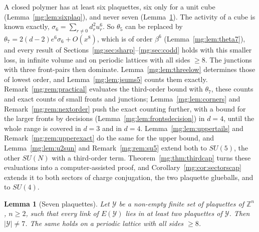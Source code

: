 \documentclass[11pt,a4paper]{article}
\newtheorem{lemma}[theorem]{Lemma}
\theoremstyle{definition}
\theoremstyle{remark}
\newcommand{\Z}{\mathbb{Z}}
\begin{document}
A closed polymer has at least six plaquettes, six only for a unit cube (Lemma~\ref{mg:lem:sixplaq}), and never seven (Lemma~\ref{mg:lem:seven}). The activity of a cube is known
exactly, $\sigma_6=\sum_{r\ne0}d_r^2u_r^6$. So $\theta_5$ can be replaced by $\theta_7=2(d-2)e^6\sigma_6+O(x^8)$, which is of order $\beta^6$ (Lemma~\ref{mg:lem:theta7}), and
every result of Sections~\ref{mg:sec:sharp}--\ref{mg:sec:codd} holds with this smaller loss, in infinite volume and on periodic lattices with all sides $\ge8$. The junctions with three
front-pairs then dominate. Lemma~\ref{mg:lem:threelow} determines
those of lowest order, and Lemma~\ref{mg:lem:jsums5} counts them exactly. Remark~\ref{mg:rem:practical} evaluates the third-order bound with $\theta_7$, these counts and exact counts
of small fronts and junctions; Lemma~\ref{mg:lem:corners} and Remark~\ref{mg:rem:nextorder} push the exact counting further, with a bound for the larger fronts by
decisions (Lemma~\ref{mg:lem:frontsdecision}) in $d=4$, until the whole range is covered in $d=3$ and in $d=4$. Lemma~\ref{mg:lem:uppertails} and Remark~\ref{mg:rem:upperexact} do the
same for the upper bound, and Lemma~\ref{mg:lem:u2sun} and Remark~\ref{mg:rem:su5} extend both to $SU(5)$, the other $SU(N)$ with a third-order term. Theorem~\ref{mg:thm:thirdcap} turns these
evaluations into a computer-assisted proof, and Corollary~\ref{mg:cor:sectorscap} extends it to both sectors of charge conjugation, the two plaquette glueballs, and to $SU(4)$.

\begin{lemma}[Seven plaquettes]\label{mg:lem:seven}
Let $\mathcal Y$ be a non-empty finite set of plaquettes of $\Z^n$, $n\ge2$, such that every link of $E(\mathcal Y)$ lies in at least two plaquettes of $\mathcal Y$. Then
$|\mathcal Y|\ne7$. The same holds on a periodic lattice with all sides $\ge8$.
\end{lemma}
\end{document}

